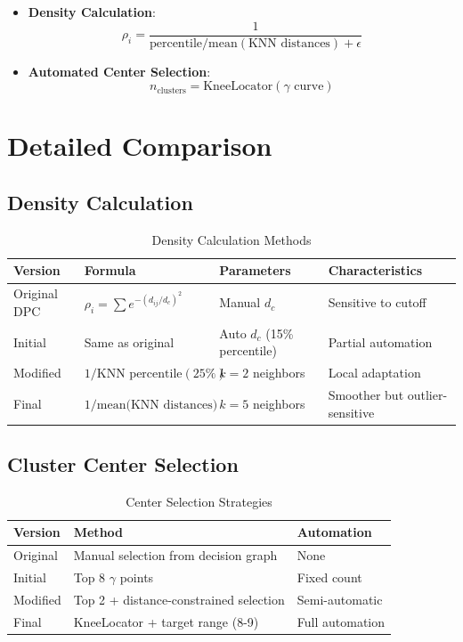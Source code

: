 \documentclass{article}
\begin{document}
\begin{itemize}
    \item \textbf{Density Calculation}:
    \begin{equation}
        \rho_i = \frac{1}{\text{percentile/mean}(\text{KNN distances}) + \epsilon}
    \end{equation}
    
    \item \textbf{Automated Center Selection}:
    \begin{equation}
        n_{\text{clusters}} = \text{KneeLocator}(\gamma \text{ curve})
    \end{equation}
\end{itemize}

\section{Detailed Comparison}

\subsection{Density Calculation}
\begin{table}[H]
\centering
\caption{Density Calculation Methods}
\begin{tabular}{llll}
\toprule
\textbf{Version} & \textbf{Formula} & \textbf{Parameters} & \textbf{Characteristics} \\
\midrule
Original DPC & $\rho_i = \sum e^{-(d_{ij}/d_c)^2}$ & Manual $d_c$ & Sensitive to cutoff \\
Initial & Same as original & Auto $d_c$ (15\% percentile) & Partial automation \\
Modified & $1/\text{KNN percentile}(25\%)$ & $k=2$ neighbors & Local adaptation \\
Final & $1/\text{mean(KNN distances)}$ & $k=5$ neighbors & Smoother but outlier-sensitive \\
\bottomrule
\end{tabular}
\end{table}

\subsection{Cluster Center Selection}
\begin{table}[H]
\centering
\caption{Center Selection Strategies}
\begin{tabular}{lll}
\toprule
\textbf{Version} & \textbf{Method} & \textbf{Automation} \\
\midrule
Original & Manual selection from decision graph & None \\
Initial & Top 8 $\gamma$ points & Fixed count \\
Modified & Top 2 + distance-constrained selection & Semi-automatic \\
Final & KneeLocator + target range (8-9) & Full automation \\
\bottomrule
\end{tabular}
\end{table}
\end{document}
